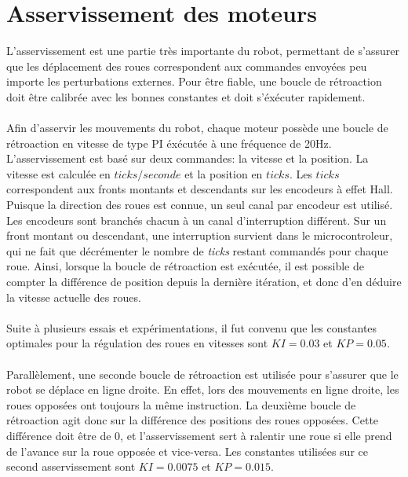 \section{Asservissement des moteurs}

L'asservissement est une partie très importante du robot, permettant de s'assurer que les déplacement des roues correspondent aux commandes envoyées
peu importe les perturbations externes. Pour être fiable, une boucle de rétroaction doit être calibrée avec les bonnes constantes et doit s'éxécuter rapidement.
\paragraph{}
Afin d'asservir les mouvements du robot, chaque moteur possède une boucle de rétroaction en vitesse de type PI éxécutée à une fréquence de 20Hz.
L'asservissement est basé sur deux commandes: la vitesse et la position. La vitesse est calculée en $ticks/seconde$ et la position en $ticks$. Les $ticks$
correspondent aux fronts montants et descendants sur les encodeurs à effet Hall. Puisque la direction des roues est connue, un seul canal par encodeur est
utilisé. Les encodeurs sont branchés chacun à un canal d'interruption différent. Sur un front montant ou descendant, une interruption survient dans
le microcontroleur, qui ne fait que décrémenter le nombre de \textit{ticks} restant commandés pour chaque roue. Ainsi, lorsque la boucle de rétroaction
est exécutée, il est possible de compter la différence de position depuis la dernière itération, et donc d'en déduire la vitesse actuelle des roues.
\paragraph{}
Suite à plusieurs essais et expérimentations, il fut convenu que les constantes optimales pour la régulation des roues en vitesses sont $KI = 0.03$ et $KP = 0.05$.
\paragraph{}
Parallèlement, une seconde boucle de rétroaction est utilisée pour s'assurer que le robot se déplace en ligne droite.
En effet, lors des mouvements en ligne droite, les roues opposées ont toujours la même instruction.
La deuxième boucle de rétroaction agit donc sur la différence des positions des roues opposées.
Cette différence doit être de 0, et l'asservissement sert à ralentir une roue si elle prend de l'avance sur la roue opposée et vice-versa.
Les constantes utilisées sur ce second asservissement sont $KI = 0.0075$ et $KP = 0.015$.

